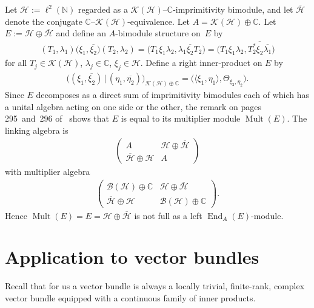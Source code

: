 \documentclass[pdftex]{sigma}
\numberwithin{equation}{section}
\DeclareMathOperator{\End}{End} %
\DeclareMathOperator{\Mult}{Mult} %
\newcommand{\C}{\mathbb{C}} %
\renewcommand{\H}{\mathcal{H}} %
\newcommand{\K}{\mathcal{K}} %
\newcommand{\N}{\mathbb{N}} %
\newcommand{\ol}[1]{\overline{#1}} %
\begin{document}
\begin{Example}Let $\H := \ell^2(\N)$ regarded as a $\K(\H)$--$\C$-imprimitivity bimodule, and let $\overline{\H}$ denote the conjugate $\C$--$\K(\H)$-equivalence. Let $A = \K(\H) \oplus \C$. Let $E := \H \oplus \overline{\H}$ and def\/ine an $A$-bi\-module structure on~$E$ by
\begin{gather*}
(T_1,\lambda_1)\big(\xi_1,\ol{\xi_2}\big)(T_2,\lambda_2)=\big(T_1\xi_1 \lambda_2, \lambda_1\ol{\xi_2}T_2\big)
=\big(T_1\xi_1 \lambda_2, \ol{T_2^*\xi_2\ol{\lambda_1}}\big)
\end{gather*}
for all $T_j\in \K(\H)$, $\lambda_j\in \C$, $\xi_j\in\H$. Def\/ine a right inner-product on $E$ by
\begin{gather*}
\big((\xi_1, \ol{\xi_2}) \,|\, (\eta_1, \ol{\eta_2})\big)_{\K(\H) \oplus \C} = \big(\langle \xi_1, \eta_1\rangle,\Theta_{\xi_2, \eta_2}\big).
\end{gather*}
Since $E$ decomposes as a direct sum of imprimitivity bimodules each of which has a unital algebra acting on one side or the other, the remark on pages 295~and~296 of~\cite{ER} shows that $E$ is equal to its multiplier module $\Mult(E)$. The linking algebra is
\begin{gather*}
\begin{pmatrix} A & \H\oplus\ol{\H}\\ \overline{\H}\oplus\H & A\end{pmatrix}
\end{gather*}
with multiplier algebra
\begin{gather*}
\begin{pmatrix} \mathcal{B}(\H)\oplus\C & \H\oplus\ol{\H}\\
\overline{\H}\oplus\H & \mathcal{B}(\H)\oplus\C\end{pmatrix}.
\end{gather*}
Hence $\Mult(E)=E=\H\oplus\ol{\H}$ is not full as a left $\End_A(E)$-module.
\end{Example}

\section{Application to vector bundles}

Recall that for us a vector bundle is always a locally trivial, f\/inite-rank, complex vector bundle equipped with a continuous family of inner products.
\end{document}
